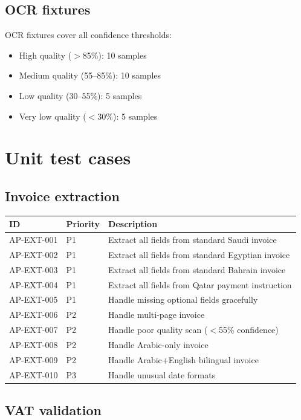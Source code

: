 \subsection{OCR fixtures}

OCR fixtures cover all confidence thresholds:
\begin{itemize}
  \item High quality ($>$85\%): 10 samples
  \item Medium quality (55--85\%): 10 samples
  \item Low quality (30--55\%): 5 samples
  \item Very low quality ($<$30\%): 5 samples
\end{itemize}

\section{Unit test cases}

\subsection{Invoice extraction}

\begin{tabularx}{\linewidth}{@{}l l X@{}}
\toprule
\textbf{ID} & \textbf{Priority} & \textbf{Description} \\ \midrule
AP-EXT-001 & P1 & Extract all fields from standard Saudi invoice \\
AP-EXT-002 & P1 & Extract all fields from standard Egyptian invoice \\
AP-EXT-003 & P1 & Extract all fields from standard Bahrain invoice \\
AP-EXT-004 & P1 & Extract all fields from Qatar payment instruction \\
AP-EXT-005 & P1 & Handle missing optional fields gracefully \\
AP-EXT-006 & P2 & Handle multi-page invoice \\
AP-EXT-007 & P2 & Handle poor quality scan ($<$55\% confidence) \\
AP-EXT-008 & P2 & Handle Arabic-only invoice \\
AP-EXT-009 & P2 & Handle Arabic+English bilingual invoice \\
AP-EXT-010 & P3 & Handle unusual date formats \\
\bottomrule
\end{tabularx}

\subsection{VAT validation}

